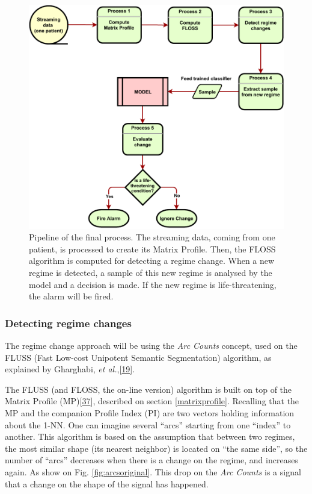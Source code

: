 \documentclass[runningheads]{llncs}
\begin{document}
\begin{figure}

{\centering \includegraphics[width=0.6\linewidth]{../../docs/figure/draw-global-model} 

}

\caption{Pipeline of the final process. The streaming data, coming from one patient, is processed to create its Matrix Profile. Then, the FLOSS algorithm is computed for detecting a regime change. When a new regime is detected, a sample of this new regime is analysed by the model and a decision is made. If the new regime is life-threatening, the alarm will be fired.}\label{fig:fullmodel}
\end{figure}

\hypertarget{detecting-regime-changes}{%
\subsubsection{Detecting regime changes}\label{detecting-regime-changes}}

The regime change approach will be using the \emph{Arc Counts} concept, used on the FLUSS (Fast Low-cost
Unipotent Semantic Segmentation) algorithm, as explained by Gharghabi, \emph{et al.},{[}\protect\hyperlink{ref-gharghabi2018}{19}{]}.

The FLUSS (and FLOSS, the on-line version) algorithm is built on top of the Matrix Profile
(MP){[}\protect\hyperlink{ref-Yeh2017a}{37}{]}, described on section \ref{matrixprofile}. Recalling that the MP and the companion
Profile Index (PI) are two vectors holding information about the 1-NN. One can imagine several
``arcs'' starting from one ``index'' to another. This algorithm is based on the assumption that between
two regimes, the most similar shape (its nearest neighbor) is located on ``the same side'', so the
number of ``arcs'' decreases when there is a change on the regime, and increases again. As show on
Fig. \ref{fig:arcsoriginal}. This drop on the \emph{Arc Counts} is a signal that a change on the shape
of the signal has happened.
\end{document}
